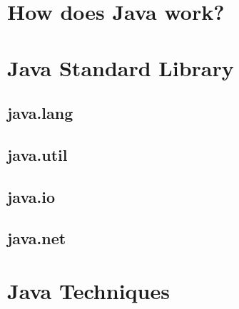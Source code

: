 
\toclineskip
\section{How does Java work?}


\toclineskip
\section{Java Standard Library}


\subsection{java.lang}


\subsection{java.util}


\subsection{java.io}


\subsection{java.net}


\toclineskip
\section{Java Techniques}

